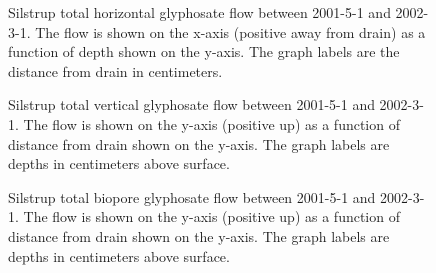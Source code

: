 \begin{figure}[htbp]
  \centering
  
  \caption{Silstrup total horizontal glyphosate flow between 2001-5-1 and
    2002-3-1.  The flow is shown on the x-axis (positive away from
    drain) as a function of depth shown on the y-axis.  The graph
    labels are the distance from drain in centimeters.}
  \label{fig:Silstrup-Glyphosate-2001-horizontal}
\end{figure}\FloatBarrier

\begin{figure}[htbp]
  \centering
  
  \caption{Silstrup total vertical glyphosate flow between 2001-5-1 and
    2002-3-1.  The flow is shown on the y-axis (positive up) as a
    function of distance from drain shown on the y-axis.  The graph
    labels are depths in centimeters above surface.}
  \label{fig:Silstrup-Glyphosate-2001-vertical}
\end{figure}\FloatBarrier

\begin{figure}[htbp]
  \centering
  
  \caption{Silstrup total biopore glyphosate flow between 2001-5-1 and
    2002-3-1.  The flow is shown on the y-axis (positive up) as a
    function of distance from drain shown on the y-axis.  The graph
    labels are depths in centimeters above surface.}
  \label{fig:Silstrup-Glyphosate-biopore-2001}
\end{figure}\FloatBarrier
